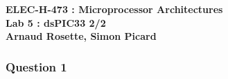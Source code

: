 \documentclass[a4paper,10pt]{article}
\begin{document}
\begin{center}
\textbf{ELEC-H-473 : Microprocessor Architectures\\ Lab 5 : dsPIC33 2/2\\Arnaud Rosette, Simon Picard}
\end{center}

\subsubsection*{Question 1}
\end{document}
